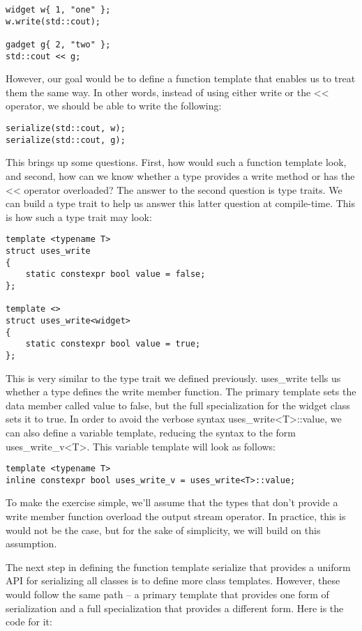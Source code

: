 \begin{lstlisting}[style=styleCXX]
widget w{ 1, "one" };
w.write(std::cout);

gadget g{ 2, "two" };
std::cout << g;
\end{lstlisting}

However, our goal would be to define a function template that enables us to treat them the same way. In other words, instead of using either write or the << operator, we should be able to write the following:

\begin{lstlisting}[style=styleCXX]
serialize(std::cout, w);
serialize(std::cout, g);
\end{lstlisting}

This brings up some questions. First, how would such a function template look, and second, how can we know whether a type provides a write method or has the << operator overloaded? The answer to the second question is type traits. We can build a type trait to help us answer this latter question at compile-time. This is how such a type trait may look:

\begin{lstlisting}[style=styleCXX]
template <typename T>
struct uses_write
{
	static constexpr bool value = false;
};

template <>
struct uses_write<widget>
{
	static constexpr bool value = true;
};
\end{lstlisting}

This is very similar to the type trait we defined previously. uses\_write tells us whether a type defines the write member function. The primary template sets the data member called value to false, but the full specialization for the widget class sets it to true. In order to avoid the verbose syntax uses\_write<T>::value, we can also define a variable template, reducing the syntax to the form uses\_write\_v<T>. This variable template will look as follows:

\begin{lstlisting}[style=styleCXX]
template <typename T>
inline constexpr bool uses_write_v = uses_write<T>::value;
\end{lstlisting}

To make the exercise simple, we’ll assume that the types that don’t provide a write member function overload the output stream operator. In practice, this is would not be the case, but for the sake of simplicity, we will build on this assumption.

The next step in defining the function template serialize that provides a uniform API for serializing all classes is to define more class templates. However, these would follow the same path – a primary template that provides one form of serialization and a full specialization that provides a different form. Here is the code for it:

